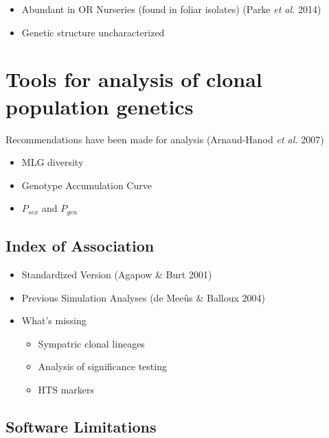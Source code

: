 \documentclass[double,12pt]{beavtex}
\providecommand{\tightlist}{%
  \setlength{\itemsep}{0pt}\setlength{\parskip}{0pt}}
\begin{document}
  \begin{itemize}
  \tightlist
  \item
    Abundant in OR Nurseries (found in foliar isolates) (Parke \emph{et
    al.} 2014)
  \item
    Genetic structure uncharacterized
  \end{itemize}
  
  \section{Tools for analysis of clonal population
  genetics}\label{tools-for-analysis-of-clonal-population-genetics}
  
  Recommendations have been made for analysis (Arnaud-Hanod \emph{et al.}
  2007)
  
  \begin{itemize}
  \tightlist
  \item
    MLG diversity
  \item
    Genotype Accumulation Curve
  \item
    \(P_{sex}\) and \(P_{gen}\)
  \end{itemize}
  
  \subsection{Index of Association}\label{index-of-association}
  
  \begin{itemize}
  \tightlist
  \item
    Standardized Version (Agapow \& Burt 2001)
  \item
    Previous Simulation Analyses (de Meeûs \& Balloux 2004)
  \item
    What's missing
  
    \begin{itemize}
    \tightlist
    \item
      Sympatric clonal lineages
    \item
      Analysis of significance testing
    \item
      HTS markers
    \end{itemize}
  \end{itemize}
  
  \subsection{Software Limitations}\label{software-limitations}
  
\end{document}
